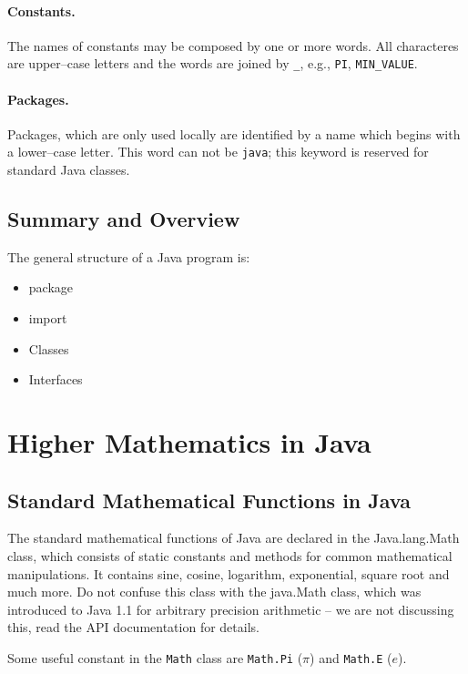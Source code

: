 \paragraph{Constants.} The names of constants may be composed by one
  or more words. All characteres are upper--case letters and the words
  are joined by \verb|_|, e.g., \verb|PI|,  \verb|MIN_VALUE|.

\paragraph{Packages.} Packages, which are only used locally are
  identified by a name which begins with a lower--case letter. This
  word can not be \verb|java|; this keyword is reserved for
  standard Java classes.



\subsection{Summary and Overview}
The general structure of a Java program is:
\begin{itemize}
\item package
\item import
\item Classes
\item Interfaces
\end{itemize}

\section{Higher Mathematics in Java}

\subsection{Standard Mathematical Functions in Java}
\label{sec:Standard_Math}

The standard mathematical functions of Java are declared in the 
Java.lang.Math class, which consists of static constants and methods
for common mathematical manipulations. 
It contains sine, cosine, logarithm, exponential,
square root and much more. Do not confuse this class with the
java.Math class, which was introduced to Java 1.1 for arbitrary
precision arithmetic -- we are not discussing this, read the
API documentation for details.

Some useful constant in the \verb|Math| class  are \verb|Math.Pi|
($\pi$) and \verb|Math.E| ($e$).



